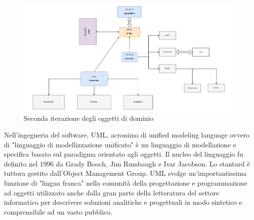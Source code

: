 {\begin{figure}[!htb]
	\begin{center}
		\hspace{-4.5 cm}
		\includegraphics[width=1.2 \linewidth]{figure/secondaIterazione}
	\end{center}
	\caption{Seconda iterazione degli oggetti di dominio\label{fig:secondaIterazione}}
\end{figure}
\newpage

Nell'ingegneria del software, UML, acronimo di unified modeling language ovvero di "linguaggio di modellizzazione unificato" \`e un linguaggio di modellazione e specifica basato sul paradigma orientato agli oggetti. Il nucleo del linguaggio fu definito nel 1996 da Grady Booch, Jim Rumbaugh e Ivar Jacobson. Lo stantard \`e tuttora gestito dall'Object Management Group. UML svolge un'importantissima funzione di "lingua franca" nella comunit\`a della progettazione e programmazione ad oggetti utilizzato anche dalla gran parte della letteratura del settore informatico per descrivere soluzioni analitiche e progettuali in modo sintetico e comprensibile ad un vasto pubblico.

}
